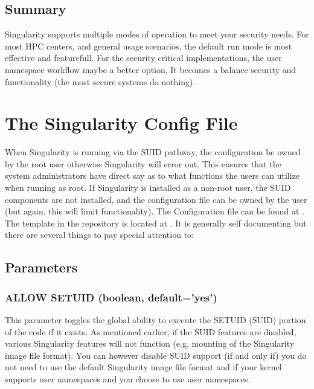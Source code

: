 \documentclass[letterpaper,10pt,english]{sphinxmanual}
\begin{document}
\section{Summary}
\label{\detokenize{security:summary}}
Singularity supports multiple modes of operation to meet your security
needs. For most HPC centers, and general usage scenarios, the default
run mode is most effective and featurefull. For the security critical
implementations, the user namespace workflow maybe a better option. It
becomes a balance security and functionality (the most secure systems do
nothing).


\chapter{The Singularity Config File}
\label{\detokenize{the_singularity_config_file:the-singularity-config-file}}\label{\detokenize{the_singularity_config_file::doc}}
When Singularity is running via the SUID pathway, the configuration
 be owned by the root user otherwise Singularity will error
out. This ensures that the system administrators have direct say as to
what functions the users can utilize when running as root. If
Singularity is installed as a non-root user, the SUID components are
not installed, and the configuration file can be owned by the user
(but again, this will limit functionality).
The Configuration file can be found at . The template in the
repository is located at . It is generally self documenting but there
are several things to pay special attention to:


\section{Parameters}
\label{\detokenize{the_singularity_config_file:parameters}}

\subsection{ALLOW SETUID (boolean, default=’yes’)}
\label{\detokenize{the_singularity_config_file:allow-setuid-boolean-default-yes}}
This parameter toggles the global ability to execute the SETUID (SUID)
portion of the code if it exists. As mentioned earlier, if the SUID
features are disabled, various Singularity features will not function
(e.g. mounting of the Singularity image file format).
You can however disable SUID support  (if and only if) you do
not need to use the default Singularity image file format and if your
kernel supports user namespaces and you choose to use user namespaces.
\end{document}
